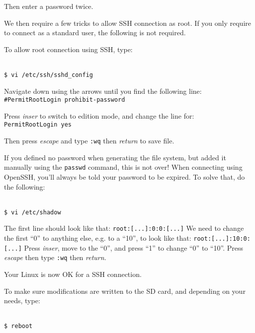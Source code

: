 \documentclass[openany,a4paper]{book}
\begin{document}
Then enter a password twice.

We then require a few tricks to allow SSH connection as root.
If you only require to connect as a standard user, the following is not required.

To allow root connection using SSH, type:

\begin{tabbing}
\kill \hspace{1cm} \= \\
\> \texttt{\$ vi /etc/ssh/sshd\_config}\\
\end{tabbing}

Navigate down using the arrows until you find the following line: \\ \texttt{\#PermitRootLogin prohibit-password}

Press \textit{inser} to switch to edition mode, and change the line for: \\ \texttt{PermitRootLogin yes}

Then press \textit{escape} and type \texttt{:wq} then \textit{return} to save file.

If you defined no password when generating the file system, but added it manually using the \texttt{passwd} command, this is not over!
When connecting using OpenSSH, you'll always be told your password to be expired.
To solve that, do the following:

\begin{tabbing}
\kill \hspace{1cm} \= \\
\> \texttt{\$ vi /etc/shadow}\\
\end{tabbing}

The first line should look like that: \texttt{root:[...]:0:0:[...]}
We need to change the first ``0'' to anything else, e.g. to a ``10'', to look like that: \texttt{root:[...]:10:0:[...]}
Press \textit{inser}, move to the ``0'', and press ``1'' to change ``0'' to ``10''.
Press \textit{escape} then type \texttt{:wq} then \textit{return}.

Your Linux is now OK for a SSH connection.

To make sure modifications are written to the SD card, and depending on your needs, type:

\begin{tabbing}
\kill \hspace{1cm} \= \\
\> \texttt{\$ reboot}\\
\end{tabbing}
\end{document}
